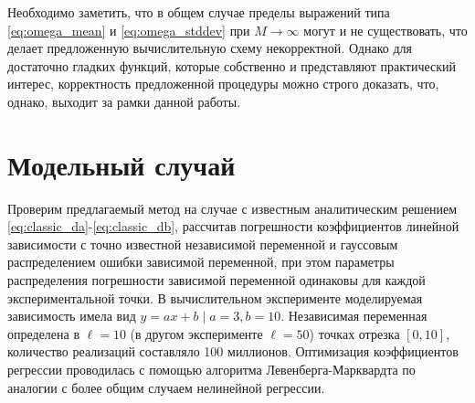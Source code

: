 \documentclass[11pt,a4paper]{article}
\theoremstyle{definition}
\begin{document}
Необходимо заметить, что в общем случае пределы выражений типа
\eqref{eq:omega_mean} и \eqref{eq:omega_stddev}
при $M \rightarrow \infty$ могут и не существовать, что делает предложенную
вычислительную схему некорректной. Однако для достаточно гладких
функций, которые собственно и представляют практический интерес,
корректность предложенной процедуры можно строго доказать, что, однако,
выходит за рамки данной работы.

\section{Модельный случай}

Проверим предлагаемый метод на случае с известным аналитическим
решением \eqref{eq:classic_da}-\eqref{eq:classic_db}, рассчитав
погрешности коэффициентов линейной зависимости с точно
известной независимой переменной и гауссовым
распределением ошибки зависимой переменной, при этом параметры
распределения погрешности зависимой переменной одинаковы для каждой
экспериментальной точки.
В вычислительном эксперименте моделируемая зависимость имела вид
$y = ax + b \mid a = 3, b = 10$. Независимая переменная
определена в $\ell = 10$ (в другом эксперименте $\ell = 50$) точках
отрезка $[0, 10]$, количество реализаций
составляло 100 миллионов. Оптимизация коэффициентов регрессии проводилась с помощью
алгоритма Левенберга-Марквардта по аналогии с более общим
случаем нелинейной регрессии.
\end{document}
